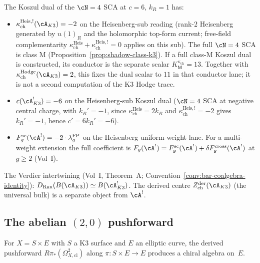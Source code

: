 \begin{proposition}
\label{prop:koszul-dual-k3}
The Koszul dual of the $\cN = 4$ SCA at $c = 6$, $k_R = 1$ has:
\begin{itemize}
\item $\kappa_{\mathrm{ch}}^{\mathrm{Heis},!}(\cA_{K3}) = -2$
 on the Heisenberg-sub reading \textup{(}rank-$2$ Heisenberg
 generated by $u(1)_R$ and the holomorphic top-form current;
 free-field complementarity $\kappa_{\mathrm{ch}}^{\mathrm{Heis}}
 + \kappa_{\mathrm{ch}}^{\mathrm{Heis},!} = 0$ applies on this
 sub\textup{)}. The full $\cN = 4$ SCA is class M
 \textup{(}Proposition~\ref{prop:shadow-class-k3}\textup{)}. If a full
 class-M Koszul dual is constructed, its conductor is the separate
 scalar \(K_{\mathsf M}^{\kappa_{\mathrm{ch}}}=13\). Together with
 \(\kappa_{\mathrm{ch}}^{\mathrm{Hodge}}(\cA_{K3})=2\), this fixes the
 dual scalar to \(11\) in that conductor lane; it is not a second
 computation of the K3 Hodge trace.
\item $c(\cA_{K3}^!) = -6$ on the Heisenberg-sub Koszul dual
 \textup{(}$\cN = 4$ SCA at negative central charge, with
 $k_R' = -1$, since $\kappa_{\mathrm{ch}}^{\mathrm{Heis}} = 2k_R$
 and $\kappa_{\mathrm{ch}}^{\mathrm{Heis},!} = -2$ gives
 $k_R' = -1$, hence $c' = 6k_R' = -6$\textup{)}.
\item $F_g^{\mathrm{sc}}(\cA^!) = -2 \cdot \lambda_g^{\mathrm{FP}}$
 on the Heisenberg uniform-weight lane.  For a multi-weight extension the
 full coefficient is
 \(F_g(\cA^!)=F_g^{\mathrm{sc}}(\cA^!)+\delta F_g^{\mathrm{cross}}(\cA^!)\)
 at $g \geq 2$ \textup{(Vol~I)}.
\end{itemize}
The Verdier intertwining \textup{(}Vol~I, Theorem~A;
Convention~\textup{\ref{conv:bar-coalgebra-identity}):}
$D_{\mathrm{Ran}}(B(\cA_{K3})) \simeq B(\cA_{K3}^!)$.
The derived centre $Z^{\mathrm{der}}_{\mathrm{ch}}(\cA_{K3})$
\textup{(}the universal bulk\textup{)} is a separate object
from $\cA^!$.
\end{proposition}



\subsection{The abelian \texorpdfstring{$(2,0)$}{(2,0)} pushforward}
\label{subsec:pushforward-k3}

For $X = S \times E$ with $S$ a K3 surface and $E$ an elliptic
curve, the derived pushforward $R\pi_*(\Omega^2_{X,\mathrm{cl}})$
along $\pi \colon S \times E \to E$ produces a chiral algebra on~$E$.

